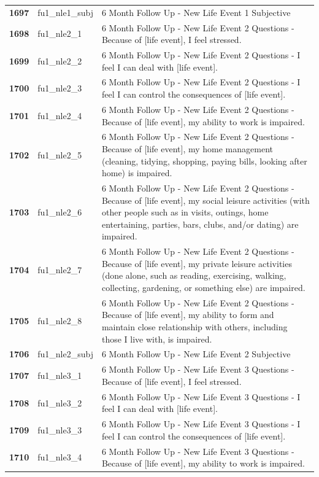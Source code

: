 \documentclass[
  letterpaper,
  DIV=11,
  numbers=noendperiod]{scrartcl}
\begin{document}
\begin{longtable}[t]{>{}cll}
\textbf{1697} & fu1\_nle1\_subj & 6 Month Follow Up - New Life Event 1 Subjective\\
\textbf{1698} & fu1\_nle2\_1 & 6 Month Follow Up - New Life Event 2 Questions - Because of [life event], I feel stressed.\\
\textbf{1699} & fu1\_nle2\_2 & 6 Month Follow Up - New Life Event 2 Questions - I feel I can deal with [life event].\\
\textbf{1700} & fu1\_nle2\_3 & 6 Month Follow Up - New Life Event 2 Questions - I feel I can control the consequences of [life event].\\
\addlinespace
\textbf{1701} & fu1\_nle2\_4 & 6 Month Follow Up - New Life Event 2 Questions - Because of [life event], my ability to work is impaired.\\
\textbf{1702} & fu1\_nle2\_5 & 6 Month Follow Up - New Life Event 2 Questions - Because of [life event], my home management (cleaning, tidying, shopping, paying bills, looking after home)  is impaired.\\
\textbf{1703} & fu1\_nle2\_6 & 6 Month Follow Up - New Life Event 2 Questions - Because of [life event], my social leisure activities (with other people such as in visits, outings, home entertaining, parties, bars, clubs, and/or dating) are impaired.\\
\textbf{1704} & fu1\_nle2\_7 & 6 Month Follow Up - New Life Event 2 Questions - Because of [life event], my private leisure activities (done alone, such as reading, exercising, walking, collecting, gardening, or something else) are impaired.\\
\textbf{1705} & fu1\_nle2\_8 & 6 Month Follow Up - New Life Event 2 Questions - Because of [life event], my ability to form and maintain close relationship with others, including those I live with, is impaired.\\
\addlinespace
\textbf{1706} & fu1\_nle2\_subj & 6 Month Follow Up - New Life Event 2 Subjective\\
\textbf{1707} & fu1\_nle3\_1 & 6 Month Follow Up - New Life Event 3 Questions - Because of [life event], I feel stressed.\\
\textbf{1708} & fu1\_nle3\_2 & 6 Month Follow Up - New Life Event 3 Questions - I feel I can deal with [life event].\\
\textbf{1709} & fu1\_nle3\_3 & 6 Month Follow Up - New Life Event 3 Questions - I feel I can control the consequences of [life event].\\
\textbf{1710} & fu1\_nle3\_4 & 6 Month Follow Up - New Life Event 3 Questions - Because of [life event], my ability to work is impaired.\\

\end{longtable}
\end{document}
